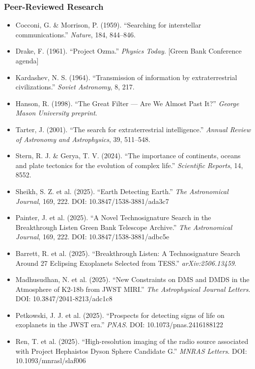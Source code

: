 \documentclass[11pt,letterpaper]{article}
\begin{document}
\subsubsection{Peer-Reviewed Research}

\begin{itemize}[leftmargin=1.5em]
  \item Cocconi, G. \& Morrison, P. (1959). ``Searching for interstellar communications.'' \textit{Nature}, 184, 844--846.
  \item Drake, F. (1961). ``Project Ozma.'' \textit{Physics Today}. [Green Bank Conference agenda]
  \item Kardashev, N. S. (1964). ``Transmission of information by extraterrestrial civilizations.'' \textit{Soviet Astronomy}, 8, 217.
  \item Hanson, R. (1998). ``The Great Filter --- Are We Almost Past It?'' \textit{George Mason University preprint}.
  \item Tarter, J. (2001). ``The search for extraterrestrial intelligence.'' \textit{Annual Review of Astronomy and Astrophysics}, 39, 511--548.
  \item Stern, R. J. \& Gerya, T. V. (2024). ``The importance of continents, oceans and plate tectonics for the evolution of complex life.'' \textit{Scientific Reports}, 14, 8552.
  \item Sheikh, S. Z. et al. (2025). ``Earth Detecting Earth.'' \textit{The Astronomical Journal}, 169, 222. DOI: 10.3847/1538-3881/ada3c7
  \item Painter, J. et al. (2025). ``A Novel Technosignature Search in the Breakthrough Listen Green Bank Telescope Archive.'' \textit{The Astronomical Journal}, 169, 222. DOI: 10.3847/1538-3881/adbc5e
  \item Barrett, R. et al. (2025). ``Breakthrough Listen: A Technosignature Search Around 27 Eclipsing Exoplanets Selected from TESS.'' \textit{arXiv:2506.13459}.
  \item Madhusudhan, N. et al. (2025). ``New Constraints on DMS and DMDS in the Atmosphere of K2-18b from JWST MIRI.'' \textit{The Astrophysical Journal Letters}. DOI: 10.3847/2041-8213/adc1c8
  \item Petkowski, J. J. et al. (2025). ``Prospects for detecting signs of life on exoplanets in the JWST era.'' \textit{PNAS}. DOI: 10.1073/pnas.2416188122
  \item Ren, T. et al. (2025). ``High-resolution imaging of the radio source associated with Project Hephaistos Dyson Sphere Candidate G.'' \textit{MNRAS Letters}. DOI: 10.1093/mnrasl/slaf006

\end{itemize}
\end{document}
